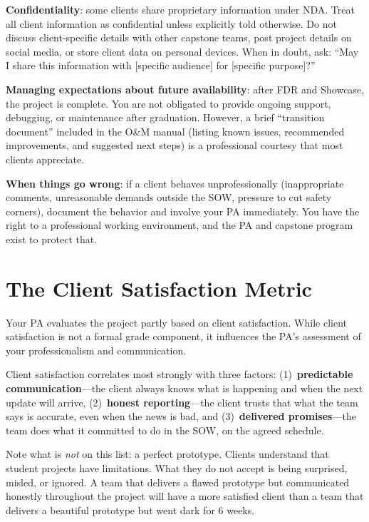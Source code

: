 \textbf{Confidentiality}: some clients share proprietary information under NDA. Treat all client information as confidential unless explicitly told otherwise. Do not discuss client-specific details with other capstone teams, post project details on social media, or store client data on personal devices. When in doubt, ask: ``May I share this information with [specific audience] for [specific purpose]?''

\textbf{Managing expectations about future availability}: after FDR and Showcase, the project is complete. You are not obligated to provide ongoing support, debugging, or maintenance after graduation. However, a brief ``transition document'' included in the O\&M manual (listing known issues, recommended improvements, and suggested next steps) is a professional courtesy that most clients appreciate.

\textbf{When things go wrong}: if a client behaves unprofessionally (inappropriate comments, unreasonable demands outside the SOW, pressure to cut safety corners), document the behavior and involve your PA immediately. You have the right to a professional working environment, and the PA and capstone program exist to protect that.

\section{The Client Satisfaction Metric}
Your PA evaluates the project partly based on client satisfaction. While client satisfaction is not a formal grade component, it influences the PA's assessment of your professionalism and communication.

Client satisfaction correlates most strongly with three factors: (1)~\textbf{predictable communication}---the client always knows what is happening and when the next update will arrive, (2)~\textbf{honest reporting}---the client trusts that what the team says is accurate, even when the news is bad, and (3)~\textbf{delivered promises}---the team does what it committed to do in the SOW, on the agreed schedule.

Note what is \emph{not} on this list: a perfect prototype. Clients understand that student projects have limitations. What they do not accept is being surprised, misled, or ignored. A team that delivers a flawed prototype but communicated honestly throughout the project will have a more satisfied client than a team that delivers a beautiful prototype but went dark for 6 weeks.



